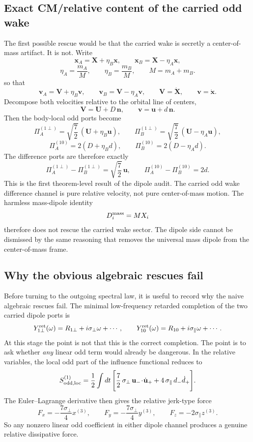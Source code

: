 \documentclass[11pt]{article}
\begin{document}
\subsection{Exact CM/relative content of the carried odd wake}
\label{sec:dipole-audit-cmrel}

The first possible rescue would be that the carried wake is secretly a
center-of-mass artifact.  It is not.  Write
\[
\mathbf x_A=\mathbf X+\eta_B\mathbf x,
\qquad
\mathbf x_B=\mathbf X-\eta_A\mathbf x,
\]
\[
\eta_A=\frac{m_A}{M},
\qquad
\eta_B=\frac{m_B}{M},
\qquad
M=m_A+m_B.
\]
so that
\[
\mathbf v_A=\mathbf V+\eta_B\mathbf v,
\qquad
\mathbf v_B=\mathbf V-\eta_A\mathbf v,
\qquad
\mathbf V=\dot{\mathbf X},
\qquad
\mathbf v=\dot{\mathbf x}.
\]
Decompose both velocities relative to the orbital line of centers,
\[
\mathbf V=\mathbf U+D\,\mathbf n,
\qquad
\mathbf v=\mathbf u+d\,\mathbf n.
\]
Then the body-local odd ports become
\[
\Pi_A^{(1\perp)}=\sqrt{\frac72}\,(\mathbf U+\eta_B\mathbf u),
\qquad
\Pi_B^{(1\perp)}=\sqrt{\frac72}\,(\mathbf U-\eta_A\mathbf u),
\]
\[
\Pi_A^{(10)}=2(D+\eta_B d),
\qquad
\Pi_B^{(10)}=2(D-\eta_A d).
\]
The difference ports are therefore exactly
\[
\boxed{\Pi_A^{(1\perp)}-\Pi_B^{(1\perp)}=\sqrt{\frac72}\,\mathbf u,}
\qquad
\boxed{\Pi_A^{(10)}-\Pi_B^{(10)}=2d.}
\]
This is the first theorem-level result of the dipole audit.  The carried odd
wake difference channel is pure relative velocity, not pure center-of-mass
motion.  The harmless mass-dipole identity
\[
D_i^{\rm mass}=MX_i
\]
therefore does not rescue the carried wake sector.  The dipole side cannot be
dismissed by the same reasoning that removes the universal mass dipole from the
center-of-mass frame.

\subsection{Why the obvious algebraic rescues fail}
\label{sec:dipole-audit-algebraic-failure}

Before turning to the outgoing spectral law, it is useful to record why the
naive algebraic rescues fail.  The minimal low-frequency retarded completion of
the two carried dipole ports is
\[
Y_{1\perp}^{\rm ret}(\omega)=R_{1\perp}+i\sigma_\perp\omega+\cdots,
\qquad
Y_{10}^{\rm ret}(\omega)=R_{10}+i\sigma_\parallel\omega+\cdots.
\]
At this stage the point is not that this is the correct completion.  The point
is to ask whether \emph{any} linear odd term would already be dangerous.  In the
relative variables, the local odd part of the influence functional reduces to
\[
S^{(1)}_{\rm odd,loc}
=
\frac12\int dt\,
\Bigg[
\frac72\,\sigma_\perp\,\mathbf u_-\!\cdot\!\dot{\mathbf u}_+
+
4\,\sigma_\parallel\,d_-\dot d_+
\Bigg].
\]
The Euler--Lagrange derivative then gives the relative jerk-type force
\[
F_x=-\frac{7\sigma_\perp}{4}x^{(3)},
\qquad
F_y=-\frac{7\sigma_\perp}{4}y^{(3)},
\qquad
F_z=-2\sigma_\parallel z^{(3)}.
\]
So any nonzero linear odd coefficient in either dipole channel produces a
genuine relative dissipative force.
\end{document}
